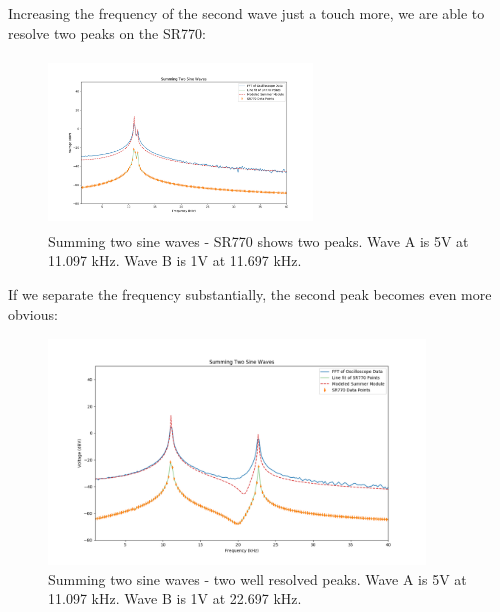 \documentclass{article}
\begin{document}
Increasing the frequency of the second wave just a touch more, we are able to
resolve two peaks on the SR770:

\begin{figure}[H]
    \centering
\begin{minipage}{11cm}
\begin{tcolorbox}
    \centering
        \includegraphics[width=7cm, height=4.5cm]{figures/figure12.png}
        \caption{Summing two sine waves - SR770 shows two peaks.
        Wave A is 5V at 11.097 kHz. Wave B is 1V at 11.697 kHz.}
        \label{fig:fig12}
\end{tcolorbox}
\end{minipage}
\end{figure}

If we separate the frequency substantially, the second peak becomes even more
obvious:

\begin{figure}[H]
    \centering
\begin{minipage}{11cm}
\begin{tcolorbox}
    \centering
        \includegraphics[width=10cm, height=6cm]{figures/figure13.png}
        \caption{Summing two sine waves - two well resolved peaks. Wave A is 5V
        at 11.097 kHz. Wave B is 1V at 22.697 kHz.}
        \label{fig:fig13}
\end{tcolorbox}
\end{minipage}
\end{figure}
\end{document}
